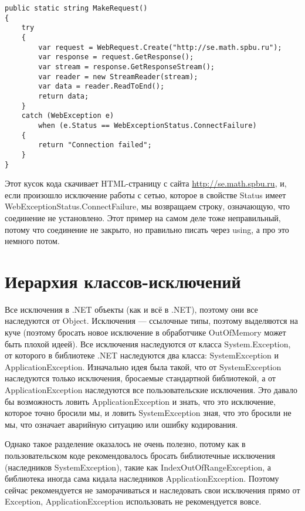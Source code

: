 \documentclass{../../text-style}
\begin{document}
\begin{verbatim}
public static string MakeRequest()
{
    try
    {
        var request = WebRequest.Create("http://se.math.spbu.ru");
        var response = request.GetResponse();
        var stream = response.GetResponseStream();
        var reader = new StreamReader(stream);
        var data = reader.ReadToEnd();
        return data;
    }
    catch (WebException e) 
        when (e.Status == WebExceptionStatus.ConnectFailure)
    {
        return "Connection failed";
    }
}
\end{verbatim}

Этот кусок кода скачивает HTML-страницу с сайта \url{http://se.math.spbu.ru}, и, если произошло исключение работы с сетью, которое в свойстве Status имеет WebExceptionStatus.ConnectFailure, мы возвращаем строку, означающую, что соединение не установлено. Этот пример на самом деле тоже неправильный, потому что соединение не закрыто, но правильно писать через using, а про это немного потом.

\section{Иерархия классов-исключений}

Все исключения в .NET объекты (как и всё в .NET), поэтому они все наследуются от Object. Исключения --- ссылочные типы, поэтому выделяются на куче (поэтому бросать новое исключение в обработчике OutOfMemory может быть плохой идеей). Все исключения наследуются от класса System.Exception, от которого в библиотеке .NET наследуются два класса: SystemException и ApplicationException. Изначально идея была такой, что от SystemException наследуются только исключения, бросаемые стандартной библиотекой, а от ApplicationException наследуются все пользовательские исключения. Это давало бы возможность ловить ApplicationException и знать, что это исключение, которое точно бросили мы, и ловить SystemException зная, что это бросили не мы, что означает аварийную ситуацию или ошибку кодирования.

Однако такое разделение оказалось не очень полезно, потому как в пользовательском коде рекомендовалось бросать библиотечные исключения (наследников SystemException), такие как IndexOutOfRangeException, а библиотека иногда сама кидала наследников ApplicationException. Поэтому сейчас рекомендуется не заморачиваться и наследовать свои исключения прямо от Exception, ApplicationException использовать не рекомендуется вовсе.
\end{document}
